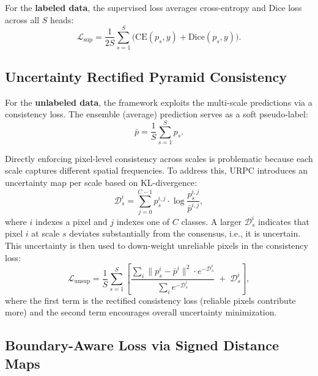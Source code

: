 For the \textbf{labeled data}, the supervised loss averages cross-entropy and Dice loss across all $S$ heads:
\begin{equation}
    \mathcal{L}_\text{sup} = \frac{1}{2S}\sum_{s=1}^{S}\bigl(\text{CE}(p_s, y) + \text{Dice}(p_s, y)\bigr).
    \label{eq:sup}
\end{equation}


\subsection{Uncertainty Rectified Pyramid Consistency}
\label{sec:urpc}

For the \textbf{unlabeled data}, the framework exploits the multi-scale predictions via a consistency loss. The ensemble (average) prediction serves as a soft pseudo-label:
\begin{equation}
    \bar{p} = \frac{1}{S}\sum_{s=1}^{S} p_s.
    \label{eq:avg}
\end{equation}

Directly enforcing pixel-level consistency across scales is problematic because each scale captures different spatial frequencies. To address this, URPC introduces an uncertainty map per scale based on KL-divergence:
\begin{equation}
    \mathcal{D}_s^i = \sum_{j=0}^{C-1} p_s^{i,j} \cdot \log \frac{p_s^{i,j}}{\bar{p}^{i,j}},
    \label{eq:uncertainty}
\end{equation}
where $i$ indexes a pixel and $j$ indexes one of $C$ classes. A larger $\mathcal{D}_s^i$ indicates that pixel $i$ at scale $s$ deviates substantially from the consensus, i.e., it is uncertain. This uncertainty is then used to down-weight unreliable pixels in the consistency loss:
\begin{equation}
    \mathcal{L}_\text{unsup}
    = \frac{1}{S}\sum_{s=1}^{S}
      \left[
        \frac{\sum_i \|p_s^i - \bar{p}^i\|^2 \cdot e^{-\mathcal{D}_s^i}}
             {\sum_i e^{-\mathcal{D}_s^i}}
        \;+\; \mathcal{D}_s^i
      \right],
    \label{eq:unsup}
\end{equation}
where the first term is the rectified consistency loss (reliable pixels contribute more) and the second term encourages overall uncertainty minimization.


\subsection{Boundary-Aware Loss via Signed Distance Maps}
\label{sec:sdm}


